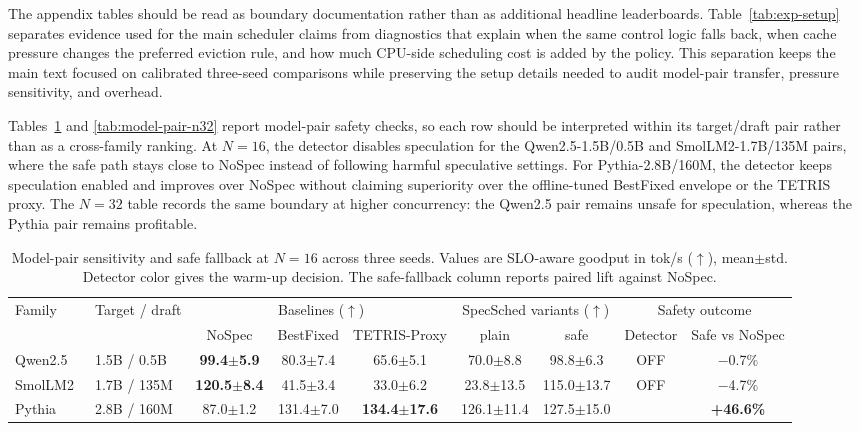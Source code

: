 \documentclass[10pt,journal,onecolumn]{IEEEtran}
\newcommand{\secondb}[1]{\cellcolor{second}#1}
\newcommand{\pos}[1]{\textcolor{green!50!black}{{\bfseries #1}}}
\newcommand{\dON}[1]{\cellcolor{green!18}{\bfseries #1}}
\newcommand{\dOFF}[1]{\cellcolor{gray!22}#1}
\newcommand{\system}{SpecSched}
\begin{document}
The appendix tables should be read as boundary documentation rather
than as additional headline leaderboards. Table~\ref{tab:exp-setup}
separates evidence used for the main scheduler claims from diagnostics
that explain when the same control logic falls back, when cache pressure
changes the preferred eviction rule, and how much CPU-side scheduling
cost is added by the policy. This separation keeps the main text focused
on calibrated three-seed comparisons while preserving the setup details
needed to audit model-pair transfer, pressure sensitivity, and overhead.

Tables~\ref{tab:model-pair-performance} and
\ref{tab:model-pair-n32} report model-pair safety checks, so each row
should be interpreted within its target/draft pair rather than as a
cross-family ranking. At $N=16$, the detector disables speculation for
the Qwen2.5-1.5B/0.5B and SmolLM2-1.7B/135M pairs, where the safe path
stays close to NoSpec instead of following harmful speculative settings.
For Pythia-2.8B/160M, the detector keeps speculation enabled and
improves over NoSpec without claiming superiority over the offline-tuned
BestFixed envelope or the TETRIS proxy. The $N=32$ table records the
same boundary at higher concurrency: the Qwen2.5 pair remains unsafe for
speculation, whereas the Pythia pair remains profitable.

\begin{table}[t]
\centering
\caption{Model-pair sensitivity and safe fallback at $N=16$ across three seeds. Values are SLO-aware goodput in tok/s ($\uparrow$), mean$\pm$std. Detector color gives the warm-up decision. The safe-fallback column reports paired lift against NoSpec.}
\label{tab:model-pair-performance}
\scriptsize
\setlength{\tabcolsep}{2.5pt}
\renewcommand{\arraystretch}{1.12}
\begin{tabular}{@{}p{}p{}ccccc cc@{}}
\toprule
\multirow{2}{*}{Family} & \multirow{2}{*}{Target / draft} &
\multicolumn{3}{c}{Baselines ($\uparrow$)} &
\multicolumn{2}{c}{\system{} variants ($\uparrow$)} &
\multicolumn{2}{c}{Safety outcome} \\
\cmidrule(lr){3-5}\cmidrule(lr){6-7}\cmidrule(l){8-9}
 & & NoSpec & BestFixed & TETRIS-Proxy & plain & safe & Detector & Safe vs NoSpec \\
\midrule
Qwen2.5 & 1.5B / 0.5B & {\bfseries 99.4$\pm$5.9} & 80.3$\pm$7.4 & 65.6$\pm$5.1 & 70.0$\pm$8.8 & 98.8$\pm$6.3 & \dOFF{OFF} & \secondb{$-$0.7\%} \\
SmolLM2~\cite{allal2025smollm2} & 1.7B / 135M & {\bfseries 120.5$\pm$8.4} & 41.5$\pm$3.4 & 33.0$\pm$6.2 & 23.8$\pm$13.5 & 115.0$\pm$13.7 & \dOFF{OFF} & \secondb{$-$4.7\%} \\
Pythia~\cite{biderman2023pythia} & 2.8B / 160M & 87.0$\pm$1.2 & 131.4$\pm$7.0 & {\bfseries 134.4$\pm$17.6} & 126.1$\pm$11.4 & 127.5$\pm$15.0 & \dON{ON} & \pos{+46.6\%} \\
\bottomrule
\end{tabular}
\vspace{-0.5em}
\end{table}
\end{document}

